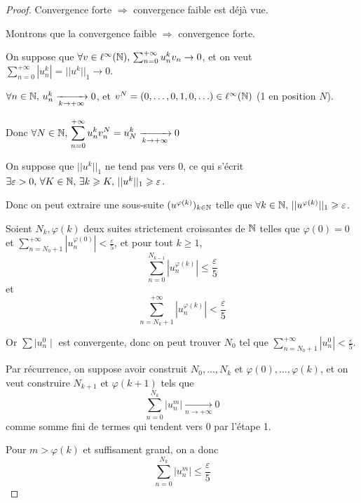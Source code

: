 \begin{proof}
    Convergence forte $\Rightarrow$ convergence faible est déjà vue.

    Montrons que la convergence faible $\Rightarrow$ convergence forte.

    On suppose que $\forall v \in \ell^\infty(\mathbb{N}), \, \sum_{n = 0}^{+\infty} u_n^k v_n \to 0$, 
    et on veut $\sum_{n = 0 }^{+\infty } |u_n^k| = ||u^k||_1 \to 0$.


    \svspace $\forall n \in \mathbb{N}, \, u_n^k \xrightarrow[k \to + \infty]{} 0$, 
    et $v^N = (0, \ldots, 0, 1, 0, \ldots) \in \ell^\infty(\mathbb{N})$ (1 en position $N$).

    Donc $\displaystyle \forall N \in \mathbb{N}, \, \sum_{n = 0 }^{+ \infty} u_n^k v_n^N = u_N^k \xrightarrow[k \to + \infty]{} 0$



    \svspace On suppose que $||u^k||_1$ ne tend pas vers $0$, ce qui s'écrit 
    $\exists \varepsilon > 0, \, \forall K \in \mathbb{N}, \, \exists k \geqslant K, \, ||u^k||_1 \geqslant \varepsilon$.

    Donc on peut extraire une sous-suite $(u^{\varphi(k)})_{k\in\mathbb{N}}$ telle que 
    $\forall k \in \mathbb{N}, \, ||u^{\varphi(k)}||_1 \geqslant \varepsilon$.


    \svspace Soient $N_k, \varphi(k)$ deux suites strictement croissantes de $\mathbb{N}$ telles 
    que $\displaystyle \varphi(0) = 0$ et 
    $\displaystyle \sum_{n = N_0 + 1}^{+\infty} |u_n^{\varphi(0)}| < \frac{\varepsilon}{5}$,
    et pour tout $k \geqslant 1$,
    \[\sum_{n = 0}^{N_{k - 1}} |u_n^{\varphi(k)}| \leqslant \frac{\varepsilon}{5}\]
    et
    \[\sum_{n = N_k + 1}^{+\infty} |u_n^{\varphi(k)}| < \frac{\varepsilon}{5}\]

    Or $\sum \mid u_n^0 \mid $ est convergente, donc on peut trouver $N_0$ tel que 
    $\sum_{n = N_0 + 1}^{+\infty} |u_n^0| < \frac{\varepsilon}{5}$.

    Par récurrence, on suppose avoir construit $N_0, \ldots, N_{k}$ et $\varphi(0), \ldots, \varphi(k)$, 
    et on veut construire $N_{k + 1}$ et $\varphi(k + 1)$ tels que 
    \[\sum_{n = 0}^{N_{k}} |u_n^{m}| \xrightarrow[n \to + \infty]{} 0\] comme 
    somme fini de termes qui tendent vers $0$ par l'étape 1.

    Pour $m > \varphi(k)$ et suffisament grand, on a donc
    \[\sum_{n = 0}^{N_{k}} |u_n^{m}| \leqslant \frac{\varepsilon}{5}\]


\end{proof}
